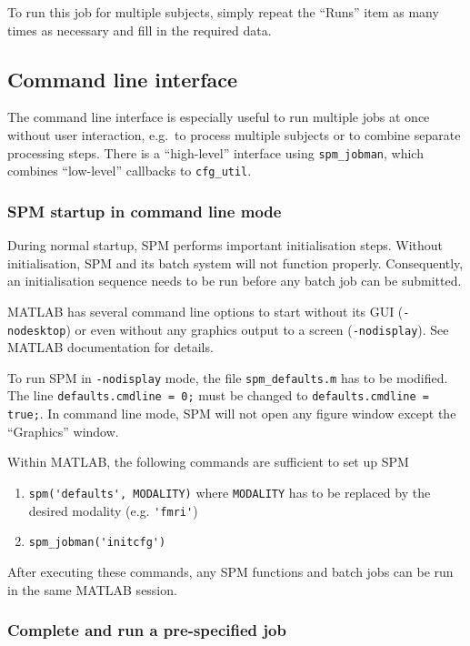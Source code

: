 To run this job for multiple subjects, simply repeat the ``Runs'' item
as many times as necessary and fill in the required data.

\subsection{Command line interface}
\label{sec:batch_interface_cmd}

The command line interface is especially useful to run multiple jobs
at once without user interaction, e.g.\ to process multiple subjects
or to combine separate processing steps. There is a ``high-level''
interface using \verb|spm_jobman|, which combines ``low-level''
callbacks to \verb|cfg_util|.

\subsubsection{SPM startup in command line mode}
\label{sec:batch_interface_spm_startup}

During normal startup, SPM performs important initialisation
steps. Without initialisation, SPM and its batch system will not
function properly. Consequently, an initialisation sequence needs to
be run before any batch job can be submitted.

MATLAB has several command line options to start without its GUI
(\verb|-nodesktop|) or even without any graphics output to a screen
(\verb|-nodisplay|). See MATLAB documentation for details.

To run SPM in \verb|-nodisplay| mode, the file \verb|spm_defaults.m|
has to be modified. The line \verb|defaults.cmdline = 0;| must be
changed to \verb|defaults.cmdline = true;|. In command line mode, SPM
will not open any figure window except the ``Graphics'' window. 

Within MATLAB, the following commands are sufficient to set up SPM
\begin{enumerate}
\item \verb|spm('defaults', MODALITY)| where \verb|MODALITY| has to be
  replaced by the desired modality (e.g. \verb|'fmri'|)
\item \verb|spm_jobman('initcfg')|
\end{enumerate}
After executing these commands, any SPM functions and batch jobs
can be run in the same MATLAB session.

\subsubsection{Complete and run a pre-specified job}
\label{sec:batch_interface_cmd_cfg_serial}

